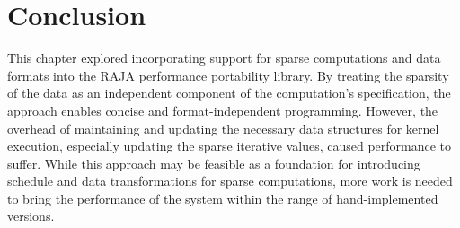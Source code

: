 \section{Conclusion}

This chapter explored incorporating support for sparse computations and data formats into the RAJA performance portability library.
By treating the sparsity of the data as an independent component of the computation's specification, the approach enables concise and format-independent programming. 
However, the overhead of maintaining and updating the necessary data structures for kernel execution, especially updating the sparse iterative values, caused performance to suffer.
While this approach may be feasible as a foundation for introducing schedule and data transformations for sparse computations, more work is needed to bring the performance of the system within the range of hand-implemented versions.

















